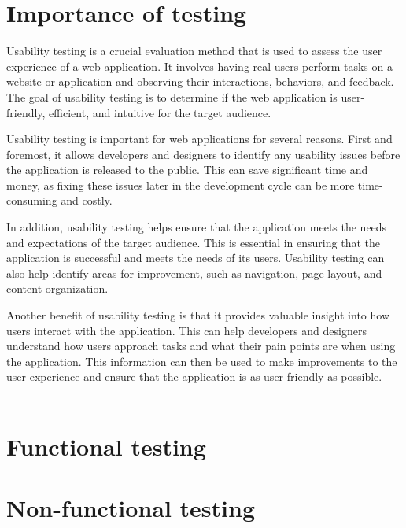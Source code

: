 \section{Importance of testing}
Usability testing is a crucial evaluation method that is used to assess the user 
experience of a web application. It involves having real users perform tasks on a 
website or application and observing their interactions, behaviors, and feedback. 
The goal of usability testing is to determine if the web application is user-friendly, 
efficient, and intuitive for the target audience.

Usability testing is important for web applications for several reasons. First and 
foremost, it allows developers and designers to identify any usability issues before 
the application is released to the public. This can save significant time and money, 
as fixing these issues later in the development cycle can be more time-consuming and costly.

In addition, usability testing helps ensure that the application meets the needs 
and expectations of the target audience. This is essential in ensuring that the 
application is successful and meets the needs of its users. Usability testing 
can also help identify areas for improvement, such as navigation, page layout, 
and content organization.

Another benefit of usability testing is that it provides valuable insight 
into how users interact with the application. This can help developers 
and designers understand how users approach tasks and what their pain 
points are when using the application. This information can then be 
used to make improvements to the user experience and ensure that 
the application is as user-friendly as possible.
\\
\\
\section{Functional testing}

\section{Non-functional testing}
